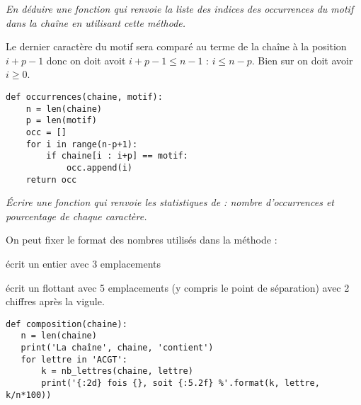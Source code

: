 \begin{Exercise}\it 
En déduire une fonction  qui renvoie la liste des indices des occurrences du motif dans la chaîne en utilisant cette méthode.
\end{Exercise}
\begin{Answer}
Le dernier caractère du motif sera comparé au terme de la chaîne à la position $i + p - 1$ donc on doit avoit $i+p-1 \le n-1$ : $i \le n-p$. Bien sur on doit avoir $i\ge 0$.
\begin{lstlisting}
def occurrences(chaine, motif):
    n = len(chaine)
    p = len(motif)
    occ = []
    for i in range(n-p+1):
        if chaine[i : i+p] == motif:
            occ.append(i)
    return occ
\end{lstlisting}
\end{Answer}
\begin{Exercise}[title = Statistiques]\it 
Écrire une fonction  qui renvoie les statistiques de  : nombre d’occurrences et pourcentage de chaque caractère.
\end{Exercise}
\begin{Answer}
On peut fixer le format des nombres utilisés dans la méthode  :

 écrit un entier avec 3 emplacements

 écrit un flottant avec 5 emplacements (y compris le point de séparation) avec 2 chiffres après la vigule.

\begin{lstlisting}
def composition(chaine):
   n = len(chaine)
   print('La chaîne', chaine, 'contient')
   for lettre in 'ACGT':
       k = nb_lettres(chaine, lettre)
       print('{:2d} fois {}, soit {:5.2f} %'.format(k, lettre, k/n*100))
\end{lstlisting}
\end{Answer}
